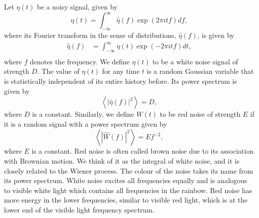 Let $\eta(t)$ be a noisy signal, given by
\begin{equation}
    \eta(t) = \int_{-\infty}^\infty \hat{\eta}(f)\exp(2\pi i t f) df,
\end{equation}
where its Fourier transform in the sense of distributions, $\hat{\eta}(f)$, is given by
\begin{equation}
    \begin{aligned}
    \hat{\eta}(f) &= \int_{-\infty}^\infty \eta(t)\exp(-2\pi i t f) dt, \\
    \end{aligned}
\end{equation}
where $f$ denotes the frequency. We define $\eta(t)$ to be a white noise signal of strength $D$. The value of $\eta(t)$ for any time $t$ is a random Gaussian variable that is statistically independent of its entire history before. Its power spectrum is given by
\begin{equation}
    \left\langle|\hat{\eta}(f)|^2\right\rangle = D,
\end{equation}
where $D$ is a constant.
Similarly, we define $W(t)$ to be red noise of strength $E$ if it is a random signal with a power spectrum given by
\begin{equation}
    \left\langle|\hat{W}(f)|^2\right\rangle = E f^{-2},
\end{equation}
where $E$ is a constant. Red noise is often called brown noise due to its association with Brownian motion. We think of it as the integral of white noise, and it is closely related to the Wiener process. The colour of the noise takes its name from its power spectrum. White noise excites all frequencies equally and is analogous to visible white light which contains all frequencies in the rainbow. Red noise has more energy in the lower frequencies, similar to visible red light, which is at the lower end of the visible light frequency spectrum.

